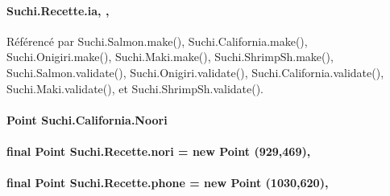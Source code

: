 \paragraph[{ia}]{ Suchi.\+Recette.\+ia\hspace{0.3cm}{\ttfamily [static]}, {\ttfamily [protected]}, {\ttfamily [inherited]}}\label{classSuchi_1_1Recette_add9d95ee8955e02592b553c7e4b719a0}


Référencé par Suchi.\+Salmon.\+make(), Suchi.\+California.\+make(), Suchi.\+Onigiri.\+make(), Suchi.\+Maki.\+make(), Suchi.\+Shrimp\+Sh.\+make(), Suchi.\+Salmon.\+validate(), Suchi.\+Onigiri.\+validate(), Suchi.\+California.\+validate(), Suchi.\+Maki.\+validate(), et Suchi.\+Shrimp\+Sh.\+validate().

\hypertarget{classSuchi_1_1California_ac7bffe55440dc042c807331fe6956f47}{}
\paragraph[{Noori}]{\setlength{\rightskip}{0pt plus 5cm}Point Suchi.\+California.\+Noori\hspace{0.3cm}{\ttfamily [package]}}\label{classSuchi_1_1California_ac7bffe55440dc042c807331fe6956f47}
\hypertarget{classSuchi_1_1Recette_ab86193f9fe4491190e232c4e7f93bed5}{}
\paragraph[{nori}]{\setlength{\rightskip}{0pt plus 5cm}final Point Suchi.\+Recette.\+nori = new Point (929,469)\hspace{0.3cm}{\ttfamily [protected]}, {\ttfamily [inherited]}}\label{classSuchi_1_1Recette_ab86193f9fe4491190e232c4e7f93bed5}
\hypertarget{classSuchi_1_1Recette_a89465932bd180079526cfc1f8b8af456}{}
\paragraph[{phone}]{\setlength{\rightskip}{0pt plus 5cm}final Point Suchi.\+Recette.\+phone = new Point (1030,620)\hspace{0.3cm}{\ttfamily [protected]}, {\ttfamily [inherited]}}\label{classSuchi_1_1Recette_a89465932bd180079526cfc1f8b8af456}
\hypertarget{classSuchi_1_1California_a9a6acc0e732a5cf01844631fde93c9c9}{}
